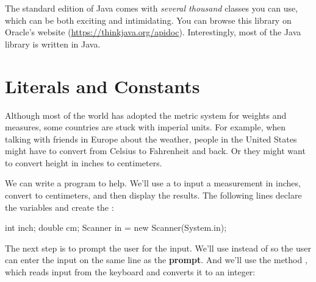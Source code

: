 The standard edition of Java comes with {\em several thousand} classes you can use, which can be both exciting and intimidating.
You can browse this library on Oracle's website (\url{https://thinkjava.org/apidoc}).
Interestingly, most of the Java library is written in Java.


\section{Literals and Constants}

Although most of the world has adopted the metric system for weights and measures, some countries are stuck with imperial units.
For example, when talking with friends in Europe about the weather, people in the United States might have to convert from Celsius to Fahrenheit and back.
Or they might want to convert height in inches to centimeters.


We can write a program to help.
We'll use a  to input a measurement in inches, convert to centimeters, and then display the results.
The following lines declare the variables and create the :

\begin{code}
int inch;
double cm;
Scanner in = new Scanner(System.in);
\end{code}


The next step is to prompt the user for the input.
We'll use  instead of  so the user can enter the input on the same line as the {\bf prompt}.
And we'll use the  method , which reads input from the keyboard and converts it to an integer:

